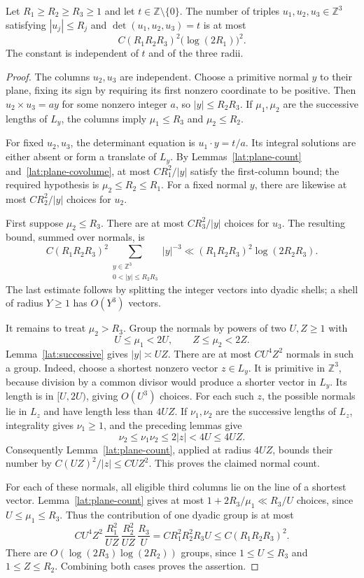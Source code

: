 \begin{lemma}\label{lat:anisotropic}
Let $R_1\ge R_2\ge R_3\ge1$ and let $t\in\mathbb Z\setminus\{0\}$.
The number of triples $u_1,u_2,u_3\in\mathbb Z^3$ satisfying
$|u_j|\le R_j$ and $\det(u_1,u_2,u_3)=t$ is at most
\[
 C(R_1R_2R_3)^2\bigl(\log(2R_1)\bigr)^2.
\]
The constant is independent of $t$ and of the three radii.
\end{lemma}

\begin{proof}
The columns $u_2,u_3$ are independent.  Choose a primitive normal $y$
to their plane, fixing its sign by requiring its first nonzero coordinate
to be positive.  Then $u_2\times u_3=a y$ for some nonzero integer $a$,
so $|y|\le R_2R_3$.  If $\mu_1,\mu_2$ are the successive lengths of
$L_y$, the columns imply $\mu_1\le R_3$ and $\mu_2\le R_2$.

For fixed $u_2,u_3$, the determinant equation is $u_1\cdot y=t/a$.
Its integral solutions are either absent or form a translate of $L_y$.
By Lemmas~\ref{lat:plane-count} and~\ref{lat:plane-covolume}, at most
$C R_1^2/|y|$ satisfy the first-column bound; the required hypothesis is
$\mu_2\le R_2\le R_1$.  For a fixed normal $y$, there are likewise at
most $C R_2^2/|y|$ choices for $u_2$.

First suppose $\mu_2\le R_3$.  There are at most
$C R_3^2/|y|$ choices for $u_3$.  The resulting bound, summed over
normals, is
\[
 C(R_1R_2R_3)^2
 \sum_{\substack{y\in\mathbb Z^3\\0<|y|\le R_2R_3}}|y|^{-3}
 \ll (R_1R_2R_3)^2\log(2R_2R_3).
\]
The last estimate follows by splitting the integer vectors into dyadic
shells; a shell of radius $Y\ge1$ has $O(Y^3)$ vectors.

It remains to treat $\mu_2>R_3$.  Group the normals by powers of two
$U,Z\ge1$ with
\[
 U\le\mu_1<2U,\qquad Z\le\mu_2<2Z.
\]
Lemma~\ref{lat:successive} gives $|y|\asymp UZ$.
There are at most $C U^4Z^2$ normals in such a group.  Indeed, choose
a shortest nonzero vector $z\in L_y$.  It is primitive in $\mathbb Z^3$,
because division by a common divisor would produce a shorter vector
in $L_y$.  Its length is in $[U,2U)$, giving $O(U^3)$ choices.
For each such $z$, the possible normals lie in $L_z$ and have length
less than $4UZ$.  If $\nu_1,\nu_2$ are the successive lengths of
$L_z$, integrality gives $\nu_1\ge1$, and the preceding lemmas give
\[
 \nu_2\le\nu_1\nu_2\le2|z|<4U\le4UZ.
\]
Consequently Lemma~\ref{lat:plane-count}, applied at radius $4UZ$,
bounds their number by
$C(UZ)^2/|z|\le C UZ^2$.  This proves the claimed normal count.

For each of these normals, all eligible third columns lie on the line
of a shortest vector.  Lemma~\ref{lat:plane-count} gives at most
$1+2R_3/\mu_1\ll R_3/U$ choices, since $U\le\mu_1\le R_3$.
Thus the contribution of one dyadic group is at most
\[
 C U^4Z^2\,
 \frac{R_1^2}{UZ}\,
 \frac{R_2^2}{UZ}\,
 \frac{R_3}{U}
 =C R_1^2R_2^2R_3U
 \le C(R_1R_2R_3)^2.
\]
There are $O(\log(2R_3)\log(2R_2))$ groups, since
$1\le U\le R_3$ and $1\le Z\le R_2$.  Combining both cases proves
the assertion.
\end{proof}

